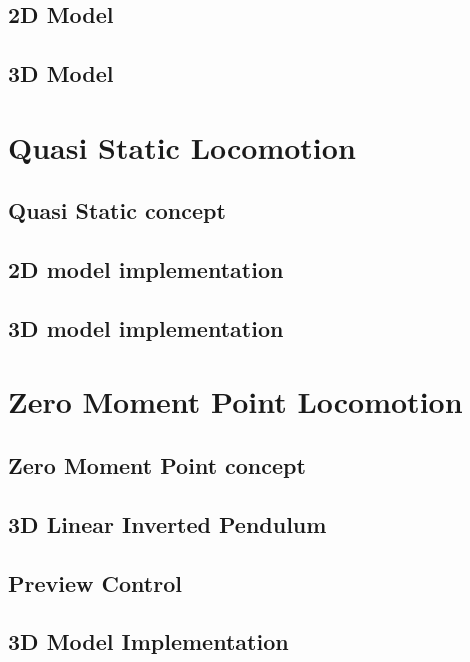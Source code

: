 \documentclass{UoNMCHA}
\begin{document}
		\subsection{2D Model}
			
		\subsection{3D Model}
			
	
	\clearpage\section{Quasi Static Locomotion}\label{sec:Quasi Static Locomotion}
		\subsection{Quasi Static concept}
			
		\subsection{2D model implementation}
			
		\subsection{3D model implementation}
			
			
	\clearpage
	\newpage\section{Zero Moment Point Locomotion}\label{sec:Zero Moment Point Locomotion}
		\subsection{Zero Moment Point concept}
			
		\subsection{3D Linear Inverted Pendulum}
			
		\subsection{Preview Control}
			
		\subsection{3D Model Implementation}
			
					
\end{document}
